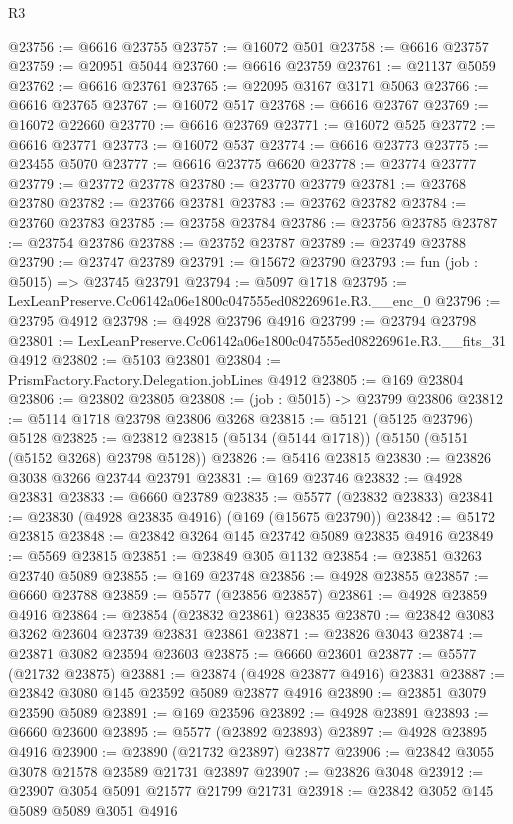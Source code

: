 \begin{lexlean}{R3}
\begin{coremodule}
@23756 := @6616 @23755
@23757 := @16072 @501
@23758 := @6616 @23757
@23759 := @20951 @5044
@23760 := @6616 @23759
@23761 := @21137 @5059
@23762 := @6616 @23761
@23765 := @22095 @3167 @3171 @5063
@23766 := @6616 @23765
@23767 := @16072 @517
@23768 := @6616 @23767
@23769 := @16072 @22660
@23770 := @6616 @23769
@23771 := @16072 @525
@23772 := @6616 @23771
@23773 := @16072 @537
@23774 := @6616 @23773
@23775 := @23455 @5070
@23777 := @6616 @23775 @6620
@23778 := @23774 @23777
@23779 := @23772 @23778
@23780 := @23770 @23779
@23781 := @23768 @23780
@23782 := @23766 @23781
@23783 := @23762 @23782
@23784 := @23760 @23783
@23785 := @23758 @23784
@23786 := @23756 @23785
@23787 := @23754 @23786
@23788 := @23752 @23787
@23789 := @23749 @23788
@23790 := @23747 @23789
@23791 := @15672 @23790
@23793 := fun (job : @5015) => @23745 @23791
@23794 := @5097 @1718
@23795 := LexLeanPreserve.Cc06142a06e1800c047555ed08226961e.R3.__enc_0
@23796 := @23795 @4912
@23798 := @4928 @23796 @4916
@23799 := @23794 @23798
@23801 := LexLeanPreserve.Cc06142a06e1800c047555ed08226961e.R3.__fits_31 @4912
@23802 := @5103 @23801
@23804 := PrismFactory.Factory.Delegation.jobLines @4912
@23805 := @169 @23804
@23806 := @23802 @23805
@23808 := (job : @5015) -> @23799 @23806
@23812 := @5114 @1718 @23798 @23806 @3268
@23815 := @5121 (@5125 @23796) @5128
@23825 := @23812 @23815 (@5134 (@5144 @1718)) (@5150 (@5151 (@5152 @3268) @23798 @5128))
@23826 := @5416 @23815
@23830 := @23826 @3038 @3266 @23744 @23791
@23831 := @169 @23746
@23832 := @4928 @23831
@23833 := @6660 @23789
@23835 := @5577 (@23832 @23833)
@23841 := @23830 (@4928 @23835 @4916) (@169 (@15675 @23790))
@23842 := @5172 @23815
@23848 := @23842 @3264 @145 @23742 @5089 @23835 @4916
@23849 := @5569 @23815
@23851 := @23849 @305 @1132
@23854 := @23851 @3263 @23740 @5089
@23855 := @169 @23748
@23856 := @4928 @23855
@23857 := @6660 @23788
@23859 := @5577 (@23856 @23857)
@23861 := @4928 @23859 @4916
@23864 := @23854 (@23832 @23861) @23835
@23870 := @23842 @3083 @3262 @23604 @23739 @23831 @23861
@23871 := @23826 @3043
@23874 := @23871 @3082 @23594 @23603
@23875 := @6660 @23601
@23877 := @5577 (@21732 @23875)
@23881 := @23874 (@4928 @23877 @4916) @23831
@23887 := @23842 @3080 @145 @23592 @5089 @23877 @4916
@23890 := @23851 @3079 @23590 @5089
@23891 := @169 @23596
@23892 := @4928 @23891
@23893 := @6660 @23600
@23895 := @5577 (@23892 @23893)
@23897 := @4928 @23895 @4916
@23900 := @23890 (@21732 @23897) @23877
@23906 := @23842 @3055 @3078 @21578 @23589 @21731 @23897
@23907 := @23826 @3048
@23912 := @23907 @3054 @5091 @21577 @21799 @21731
@23918 := @23842 @3052 @145 @5089 @5089 @3051 @4916

\end{coremodule}
\end{lexlean}
